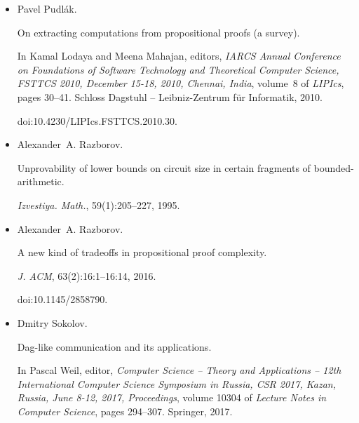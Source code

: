 \begin{itemize}
Noam Nisan and Avi Wigderson.


Rounds in communication complexity revisited.


\emph{SIAM J. Comput.}, 22(1):211–219, 1993.


doi:10.1137/0222016.





\item[] 
[22]

Pavel Pudlák.


On extracting computations from propositional proofs (a survey).


In Kamal Lodaya and Meena Mahajan, editors, \emph{IARCS Annual
Conference on Foundations of Software Technology and Theoretical Computer
Science, FSTTCS 2010, December 15-18, 2010, Chennai, India}, volume 8 of
\emph{LIPIcs}, pages 30–41. Schloss Dagstuhl – Leibniz-Zentrum für
Informatik, 2010.


doi:10.4230/LIPIcs.FSTTCS.2010.30.





\item[] 
[23]

Alexander A. Razborov.


Unprovability of lower bounds on circuit size in certain fragments of
bounded-arithmetic.


\emph{Izvestiya. Math.}, 59(1):205–227, 1995.





\item[] 
[24]

Alexander A. Razborov.


A new kind of tradeoffs in propositional proof complexity.


\emph{J. ACM}, 63(2):16:1–16:14, 2016.


doi:10.1145/2858790.





\item[] 
[25]

Dmitry Sokolov.


Dag-like communication and its applications.


In Pascal Weil, editor, \emph{Computer Science – Theory and
Applications – 12th International Computer Science Symposium in Russia,
CSR 2017, Kazan, Russia, June 8-12, 2017, Proceedings}, volume 10304 of
\emph{Lecture Notes in Computer Science}, pages 294–307. Springer, 2017.



\end{itemize}
